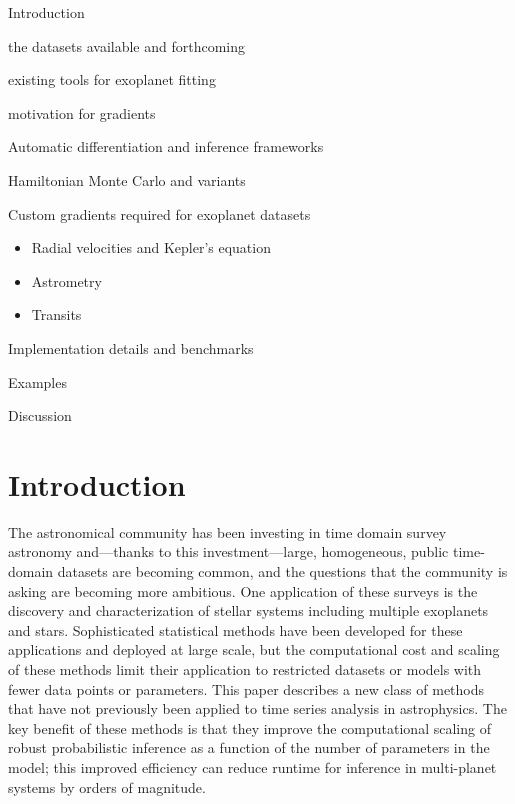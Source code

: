 \documentclass[modern]{aastex62}
\begin{document}
\begin{enumerate}

{\item Introduction
\begin{itemize}
{\item the datasets available and forthcoming}
{\item existing tools for exoplanet fitting}
{\item motivation for gradients}
\end{itemize}}

\item Automatic differentiation and inference frameworks

\item Hamiltonian Monte Carlo and variants

\item Custom gradients required for exoplanet datasets
\begin{itemize}
\item Radial velocities and Kepler's equation
\item Astrometry
\item Transits
\end{itemize}

\item Implementation details and benchmarks

\item Examples

\item Discussion

\end{enumerate}

\section{Introduction}

The astronomical community has been investing in time domain survey astronomy and---thanks to this investment---large, homogeneous, public time-domain datasets are becoming common, and the questions that the community is asking are becoming more ambitious.
One application of these surveys is the discovery and characterization of stellar systems including multiple exoplanets and stars.
Sophisticated statistical methods have been developed for these applications and deployed at large scale, but the computational cost and scaling of these methods limit their application to restricted datasets or models with fewer data points or parameters.
This paper describes a new class of methods that have not previously been applied to time series analysis in astrophysics.
The key benefit of these methods is that they improve the computational scaling of robust probabilistic inference as a function of the number of parameters in the model; this improved efficiency can reduce runtime for inference in multi-planet systems by orders of magnitude.
\end{document}
